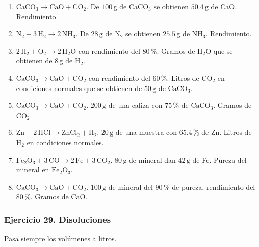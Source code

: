 \begin{enumerate}
    \item[a)] $\mathrm{CaCO_3}\rightarrow\mathrm{CaO}+\mathrm{CO_2}$.
    De $100\,\mathrm{g}$ de $\mathrm{CaCO_3}$ se obtienen
    $50.4\,\mathrm{g}$ de $\mathrm{CaO}$. Rendimiento.

    \item[b)] $\mathrm{N_2}+3\,\mathrm{H_2}\rightarrow2\,\mathrm{NH_3}$.
    De $28\,\mathrm{g}$ de $\mathrm{N_2}$ se obtienen
    $25.5\,\mathrm{g}$ de $\mathrm{NH_3}$. Rendimiento.

    \item[c)] $2\,\mathrm{H_2}+\mathrm{O_2}\rightarrow2\,\mathrm{H_2O}$
    con rendimiento del $80\,\%$.
    Gramos de $\mathrm{H_2O}$ que se obtienen de
    $8\,\mathrm{g}$ de $\mathrm{H_2}$.

    \item[d)] $\mathrm{CaCO_3}\rightarrow\mathrm{CaO}+\mathrm{CO_2}$
    con rendimiento del $60\,\%$.
    Litros de $\mathrm{CO_2}$ en condiciones normales que se obtienen
    de $50\,\mathrm{g}$ de $\mathrm{CaCO_3}$.

    \item[e)] $\mathrm{CaCO_3}\rightarrow\mathrm{CaO}+\mathrm{CO_2}$.
    $200\,\mathrm{g}$ de una caliza con $75\,\%$ de $\mathrm{CaCO_3}$.
    Gramos de $\mathrm{CO_2}$.

    \item[f)] $\mathrm{Zn}+2\,\mathrm{HCl}\rightarrow
    \mathrm{ZnCl_2}+\mathrm{H_2}$.
    $20\,\mathrm{g}$ de una muestra con $65.4\,\%$ de Zn.
    Litros de $\mathrm{H_2}$ en condiciones normales.

    \item[g)] $\mathrm{Fe_2O_3}+3\,\mathrm{CO}\rightarrow
    2\,\mathrm{Fe}+3\,\mathrm{CO_2}$.
    $80\,\mathrm{g}$ de mineral dan $42\,\mathrm{g}$ de Fe.
    Pureza del mineral en $\mathrm{Fe_2O_3}$.

    \item[h)] $\mathrm{CaCO_3}\rightarrow\mathrm{CaO}+\mathrm{CO_2}$.
    $100\,\mathrm{g}$ de mineral del $90\,\%$ de pureza,
    rendimiento del $80\,\%$.
    Gramos de $\mathrm{CaO}$.
\end{enumerate}

\subsubsection*{Ejercicio 29. Disoluciones}

Pasa siempre los volúmenes a litros.

